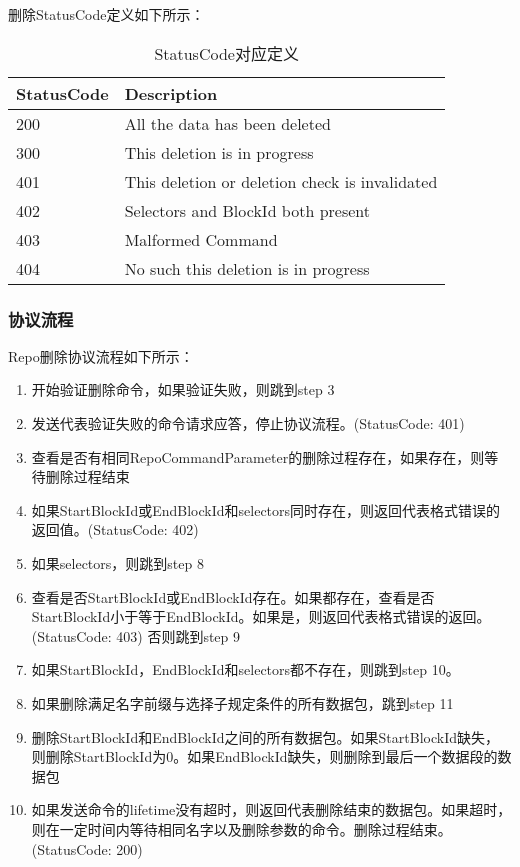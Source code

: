 删除StatusCode定义如下所示：

\begin{table}[h]
\centering
\caption{StatusCode对应定义}
\label{tab:del-statusCode}
\begin{tabular}{|l|l|}
\hline
\textbf{StatusCode} & \textbf{Description} \\ \hline
200 & All the data has been deleted \\ \hline
300 & This deletion is in progress \\ \hline
401 & This deletion or deletion check is invalidated \\ \hline
402 & Selectors and BlockId both present \\ \hline
403 & Malformed Command \\ \hline
404 & No such this deletion is in progress \\ \hline
\end{tabular}
\end{table}

\subsubsection{协议流程}
Repo删除协议流程如下所示：
\begin{enumerate}[step 1.]
\item 开始验证删除命令，如果验证失败，则跳到step 3
\item 发送代表验证失败的命令请求应答，停止协议流程。(StatusCode: 401)
\item 查看是否有相同RepoCommandParameter的删除过程存在，如果存在，则等待删除过程结束
\item 如果StartBlockId或EndBlockId和selectors同时存在，则返回代表格式错误的返回值。(StatusCode: 402)
\item 如果selectors，则跳到step 8
\item 查看是否StartBlockId或EndBlockId存在。如果都存在，查看是否StartBlockId小于等于EndBlockId。如果是，则返回代表格式错误的返回。 (StatusCode: 403) 否则跳到step 9
\item 如果StartBlockId，EndBlockId和selectors都不存在，则跳到step 10。
\item 如果删除满足名字前缀与选择子规定条件的所有数据包，跳到step 11
\item 删除StartBlockId和EndBlockId之间的所有数据包。如果StartBlockId缺失，则删除StartBlockId为0。如果EndBlockId缺失，则删除到最后一个数据段的数据包
\item 如果发送命令的lifetime没有超时，则返回代表删除结束的数据包。如果超时，则在一定时间内等待相同名字以及删除参数的命令。删除过程结束。(StatusCode: 200)
\end{enumerate}

